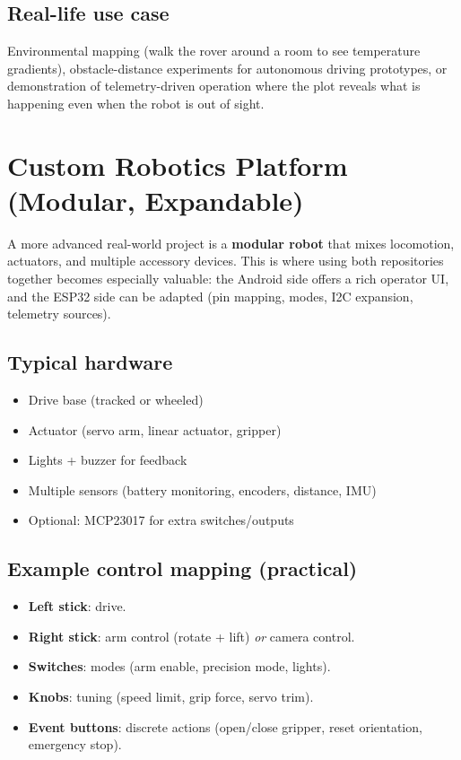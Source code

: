 \subsection*{Real-life use case}
Environmental mapping (walk the rover around a room to see temperature gradients), obstacle-distance experiments for autonomous driving prototypes, or demonstration of telemetry-driven operation where the plot reveals what is happening even when the robot is out of sight.

\section{Custom Robotics Platform (Modular, Expandable)}
\label{sec:example-custom-robot}

A more advanced real-world project is a \textbf{modular robot} that mixes locomotion, actuators, and multiple accessory devices. This is where using both repositories together becomes especially valuable: the Android side offers a rich operator UI, and the ESP32 side can be adapted (pin mapping, modes, I2C expansion, telemetry sources).

\subsection*{Typical hardware}
\begin{itemize}
    \item Drive base (tracked or wheeled)
    \item Actuator (servo arm, linear actuator, gripper)
    \item Lights + buzzer for feedback
    \item Multiple sensors (battery monitoring, encoders, distance, IMU)
    \item Optional: MCP23017 for extra switches/outputs
\end{itemize}

\subsection*{Example control mapping (practical)}
\begin{itemize}
    \item \textbf{Left stick}: drive.
    \item \textbf{Right stick}: arm control (rotate + lift) \emph{or} camera control.
    \item \textbf{Switches}: modes (arm enable, precision mode, lights).
    \item \textbf{Knobs}: tuning (speed limit, grip force, servo trim).
    \item \textbf{Event buttons}: discrete actions (open/close gripper, reset orientation, emergency stop).
\end{itemize}

